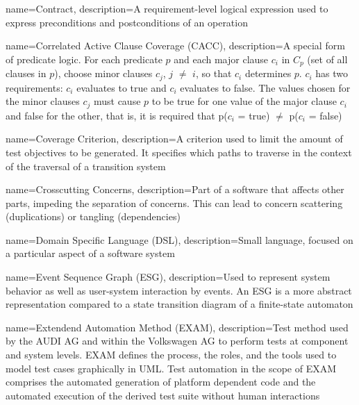 {
	name={Contract},
	description={A requirement-level logical expression used to express preconditions and postconditions of an operation \cite{ClementineNebut2006}}
}

{
	name={Correlated Active Clause Coverage (CACC)},
	description={A special form of predicate logic. For each predicate $p$ and each major clause $c_i$  in $C_p$ (set of all clauses in $p$), choose minor clauses $c_j$,  $j$ $\neq$ $i$, so that $c_i$ determines $p$. $c_i$ has two requirements: $c_i$ evaluates to true and $c_i$ evaluates to false. The values chosen for the minor clauses $c_j$ must cause $p$ to be true for one value of the major clause $c_i$ and false for the other, that is, it is required that p($c_i$ = true) $\neq$ p($c_i$ = false) \cite{Ammann2021}}
}

{
	name={Coverage Criterion},
	description={A criterion used to limit the amount of test objectives to be generated. It specifies which paths to traverse in the context of the traversal of a transition system \cite{ClementineNebut2006}}
}

{
	name={Crosscutting Concerns},
	description={Part of a software that affects other parts, impeding the separation of concerns. This can lead to concern scattering (duplications) or tangling (dependencies) \cite{Metsa}}
}

{
	name={Domain Specific Language (DSL)},
	description={Small language, focused on a particular aspect of a software system \cite{Fowler2010}}
}

{
	name={Event Sequence Graph (ESG)},
	description={Used to represent system behavior as well as user-system interaction by events. An ESG is a more abstract representation compared to a state transition diagram of a finite-state automaton \cite{Belli2009}}
}

{
	name={Extendend Automation Method (EXAM)},
	description={Test method used by the AUDI AG and within the Volkswagen AG to perform tests at component and system levels. EXAM defines the process, the roles, and the tools used to model test cases graphically in UML. Test automation in the scope of EXAM comprises the automated generation of platform dependent code and the automated execution of the derived test suite without human interactions \cite{Siegl2010}}
}

